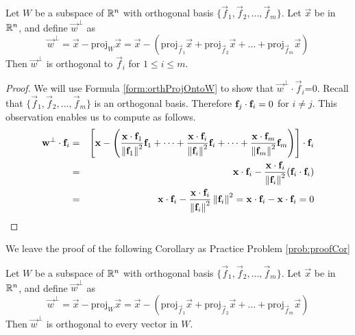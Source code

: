 \documentclass{ximera}
\begin{document}
\begin{theorem}\label{th:orthDecompX}
Let $W$ be a subspace of $\mathbb{R}^n$ with orthogonal basis $\{\vec{f}_{1}, \vec{f}_{2}, \dots, \vec{f}_{m}\}$. Let $\vec{x}$ be in $\mathbb{R}^n$, and define $\vec{w}^\perp$ as
\begin{equation*}
\vec{w}^\perp=\vec{x}-\mbox{proj}_W\vec{x} = \vec{x}-(\mbox{proj}_{\vec{f}_1}\vec{x} + \mbox{proj}_{\vec{f}_2}\vec{x} + \dots + \mbox{proj}_{\vec{f}_m}\vec{x})
\end{equation*}
Then $\vec{w}^\perp$ is orthogonal to $\vec{f}_i$ for $1\leq i\leq m$.
\end{theorem}
\begin{proof}
We will use Formula \ref{form:orthProjOntoW} to show that $\vec{w}^\perp\cdot \vec{f}_i$=0.  Recall that $\{\vec{f}_{1}, \vec{f}_{2}, \dots, \vec{f}_{m}\}$ is an orthogonal basis.  Therefore $\mathbf{f}_j\cdot\mathbf{f}_i=0$ for $i\neq j$.  This observation enables us to compute as follows.
\begin{eqnarray*}
\mathbf{w}^\perp\cdot \mathbf{f}_i&=&\left[\mathbf{x}-\left(\frac{\mathbf{x} \cdot \mathbf{f}_{1}}{\left\lVert\mathbf{f}_{1}\right\rVert^2}\mathbf{f}_{1} +\dots + \frac{\mathbf{x} \cdot \mathbf{f}_{i}}{\left\lVert\mathbf{f}_{i}\right\rVert^2}\mathbf{f}_{i}+ \dots +\frac{\mathbf{x} \cdot \mathbf{f}_{m}}{\left\lVert\mathbf{f}_{m}\right\rVert^2}\mathbf{f}_{m}\right)\right]\cdot \mathbf{f}_i\\
& =& \mathbf{x}\cdot \mathbf{f}_i- \frac{\mathbf{x} \cdot \mathbf{f}_{i}}{\left\lVert\mathbf{f}_{i}\right\rVert^2}(\mathbf{f}_{i}\cdot\mathbf{f}_i)\\
&=& \mathbf{x}\cdot \mathbf{f}_i- \frac{\mathbf{x} \cdot \mathbf{f}_{i}}{\left\lVert\mathbf{f}_{i}\right\rVert^2}\left\lVert\mathbf{f}_{i}\right\rVert^2=\mathbf{x}\cdot \mathbf{f}_i-\mathbf{x}\cdot \mathbf{f}_i=0
\end{eqnarray*}
\end{proof}

We leave the proof of the following Corollary as Practice Problem \ref{prob:proofCor}
\begin{corollary}\label{cor:orthProjOntoW}
Let $W$ be a subspace of $\mathbb{R}^n$ with orthogonal basis $\{\vec{f}_{1}, \vec{f}_{2}, \dots, \vec{f}_{m}\}$. Let $\vec{x}$ be in $\mathbb{R}^n$, and define $\vec{w}^\perp$ as
\begin{equation*}
\vec{w}^\perp=\vec{x}-\mbox{proj}_W\vec{x} = \vec{x}-(\mbox{proj}_{\vec{f}_1}\vec{x} + \mbox{proj}_{\vec{f}_2}\vec{x} + \dots + \mbox{proj}_{\vec{f}_m}\vec{x})
\end{equation*}
Then $\vec{w}^\perp$ is orthogonal to every vector in $W$.
\end{corollary}
\end{document}
